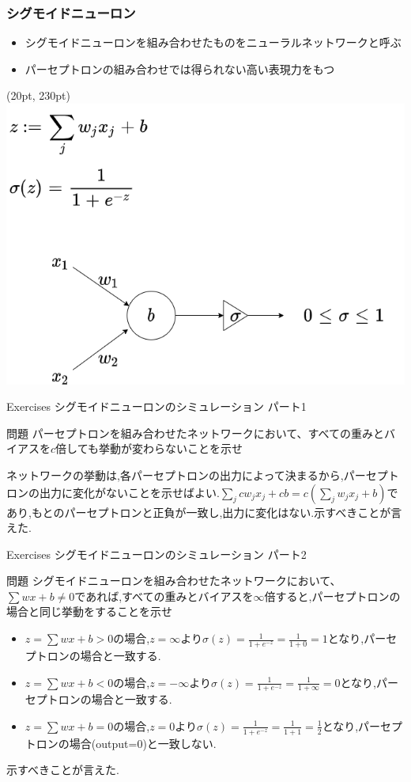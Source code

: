 \documentclass[t,dvipdfmx,10pt]{beamer}
\begin{document}
\begin{frame}
\frametitle{シグモイドニューロン}
\begin{itemize}
    \item シグモイドニューロンを組み合わせたものをニューラルネットワークと呼ぶ
    \item パーセプトロンの組み合わせでは得られない高い表現力をもつ
\end{itemize}
\begin{textblock*}{0.06\linewidth}(20pt, 230pt)
    \centering
    \includegraphics[width=\linewidth]{./sigmoid.png}
    
\end{textblock*}
\end{frame}
\begin{frame}{Exercises シグモイドニューロンのシミュレーション パート1}
\begin{block}{問題}
パーセプトロンを組み合わせたネットワークにおいて、すべての重みとバイアスを$c$倍しても挙動が変わらないことを示せ
\end{block}
ネットワークの挙動は,各パーセプトロンの出力によって決まるから,パーセプトロンの出力に変化がないことを示せばよい.$\sum_j cw_j x_j+cb=c(\sum_j w_j x_j+b)$であり,もとのパーセプトロンと正負が一致し,出力に変化はない.示すべきことが言えた.
\end{frame}
\begin{frame}{Exercises シグモイドニューロンのシミュレーション パート2}
\begin{block}{問題}
シグモイドニューロンを組み合わせたネットワークにおいて、$\sum wx+b\neq 0$であれば,すべての重みとバイアスを$\infty$倍すると,パーセプトロンの場合と同じ挙動をすることを示せ
\end{block}  
\begin{itemize}
    \item $z=\sum wx+b>0$の場合,$z=\infty$より$\sigma(z)=\frac{1}{1+e^{-z}}=\frac{1}{1+0}=1$となり,パーセプトロンの場合と一致する.
    \item $z=\sum wx+b<0$の場合,$z=-\infty$より$\sigma(z)=\frac{1}{1+e^{-z}}=\frac{1}{1+\infty}=0$となり,パーセプトロンの場合と一致する.
    \item $z=\sum wx+b=0$の場合,$z=0$より$\sigma(z)=\frac{1}{1+e^{-z}}=\frac{1}{1+1}=\frac{1}{2}$となり,パーセプトロンの場合(output=0)と一致しない.
\end{itemize}
示すべきことが言えた.
\end{frame}
\end{document}
